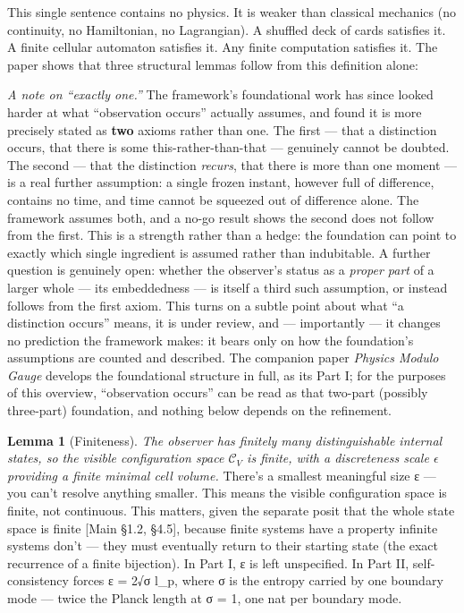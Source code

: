 \documentclass[
]{article}
\begin{document}
This single sentence contains no physics. It is weaker than classical
mechanics (no continuity, no Hamiltonian, no Lagrangian). A shuffled
deck of cards satisfies it. A finite cellular automaton satisfies it.
Any finite computation satisfies it. The paper shows that three
structural lemmas follow from this definition alone:

\emph{A note on ``exactly one.''} The framework's foundational work has
since looked harder at what ``observation occurs'' actually assumes, and
found it is more precisely stated as \textbf{two} axioms rather than
one. The first --- that a distinction occurs, that there is some
this-rather-than-that --- genuinely cannot be doubted. The second ---
that the distinction \emph{recurs}, that there is more than one moment
--- is a real further assumption: a single frozen instant, however full
of difference, contains no time, and time cannot be squeezed out of
difference alone. The framework assumes both, and a no-go result shows
the second does not follow from the first. This is a strength rather
than a hedge: the foundation can point to exactly which single
ingredient is assumed rather than indubitable. A further question is
genuinely open: whether the observer's status as a \emph{proper part} of
a larger whole --- its embeddedness --- is itself a third such
assumption, or instead follows from the first axiom. This turns on a
subtle point about what ``a distinction occurs'' means, it is under
review, and --- importantly --- it changes no prediction the framework
makes: it bears only on how the foundation's assumptions are counted and
described. The companion paper \emph{Physics Modulo Gauge} develops the
foundational structure in full, as its Part I; for the purposes of this
overview, ``observation occurs'' can be read as that two-part (possibly
three-part) foundation, and nothing below depends on the refinement.

\textbf{Lemma 1} (Finiteness). \emph{The observer has finitely many
distinguishable internal states, so the visible configuration space
\(\mathcal{C}_V\) is finite, with a discreteness scale \(\epsilon\)
providing a finite minimal cell volume.} There's a smallest meaningful
size ε --- you can't resolve anything smaller. This means the visible
configuration space is finite, not continuous. This matters, given the
separate posit that the whole state space is finite {[}Main §1.2,
§4.5{]}, because finite systems have a property infinite systems don't
--- they must eventually return to their starting state (the exact
recurrence of a finite bijection). In Part I, ε is left unspecified. In
Part II, self-consistency forces ε = 2√σ l\_p, where σ is the entropy
carried by one boundary mode --- twice the Planck length at σ = 1, one
nat per boundary mode.
\end{document}
